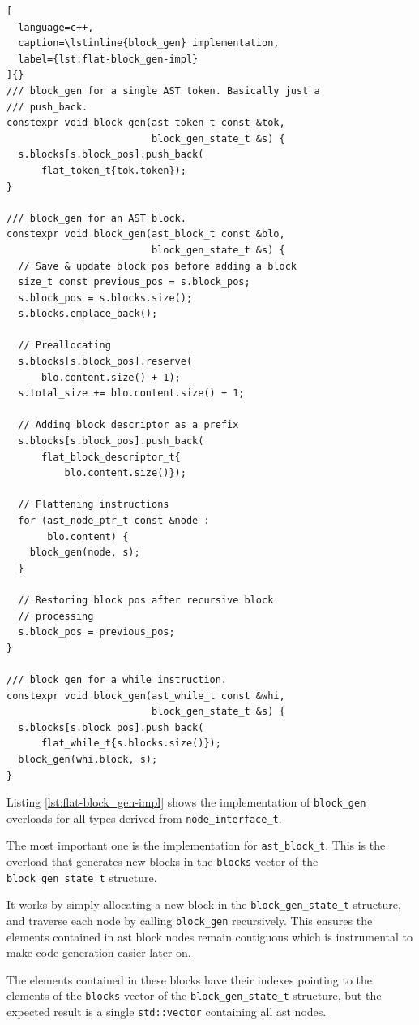 \documentclass[../main]{subfiles}
\begin{document}
\begin{lstlisting}[
  language=c++,
  caption=\lstinline{block_gen} implementation,
  label={lst:flat-block_gen-impl}
]{}
/// block_gen for a single AST token. Basically just a
/// push_back.
constexpr void block_gen(ast_token_t const &tok,
                         block_gen_state_t &s) {
  s.blocks[s.block_pos].push_back(
      flat_token_t{tok.token});
}

/// block_gen for an AST block.
constexpr void block_gen(ast_block_t const &blo,
                         block_gen_state_t &s) {
  // Save & update block pos before adding a block
  size_t const previous_pos = s.block_pos;
  s.block_pos = s.blocks.size();
  s.blocks.emplace_back();

  // Preallocating
  s.blocks[s.block_pos].reserve(
      blo.content.size() + 1);
  s.total_size += blo.content.size() + 1;

  // Adding block descriptor as a prefix
  s.blocks[s.block_pos].push_back(
      flat_block_descriptor_t{
          blo.content.size()});

  // Flattening instructions
  for (ast_node_ptr_t const &node :
       blo.content) {
    block_gen(node, s);
  }

  // Restoring block pos after recursive block
  // processing
  s.block_pos = previous_pos;
}

/// block_gen for a while instruction.
constexpr void block_gen(ast_while_t const &whi,
                         block_gen_state_t &s) {
  s.blocks[s.block_pos].push_back(
      flat_while_t{s.blocks.size()});
  block_gen(whi.block, s);
}
\end{lstlisting}

Listing \ref{lst:flat-block_gen-impl} shows the implementation of
\lstinline{block_gen} overloads for all types derived from
\lstinline{node_interface_t}.

The most important one is the implementation for \lstinline{ast_block_t}.
This is the overload that generates new blocks in the \lstinline{blocks} vector
of the \lstinline{block_gen_state_t} structure.

It works by simply allocating a new block in the \lstinline{block_gen_state_t}
structure, and traverse each node by calling \lstinline{block_gen} recursively.
This ensures the elements contained in \gls{ast} block nodes remain contiguous
which is instrumental to make code generation easier later on.

The elements contained in these blocks have their indexes pointing to
the elements of the \lstinline{blocks} vector
of the \lstinline{block_gen_state_t} structure, but the expected result is a
single \lstinline{std::vector} containing all \gls{ast} nodes.
\end{document}

